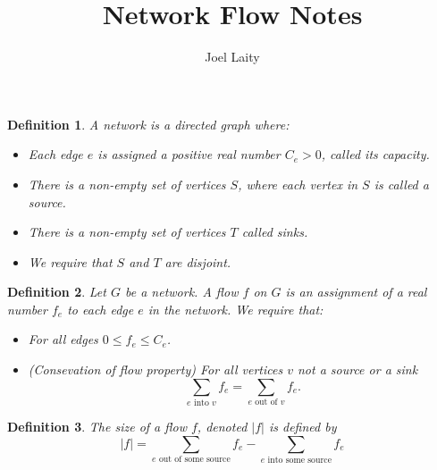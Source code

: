 \documentclass[12pt]{article}
\title{Network Flow Notes}
\author{Joel Laity}
\newtheorem{Definition}{Definition}
\begin{document}
\maketitle


\begin{Definition}
    A network is a directed graph where:
    \begin{itemize}
        \item Each edge $e$ is assigned a positive real number $C_e >0 $, called its \emph{capacity}.
        \item There is a non-empty set of vertices $S$, where each vertex in $S$ is called a \emph{source}.
        \item There is a non-empty set of vertices $T$ called \emph{sinks}.
        \item We require that $S$ and $T$ are disjoint.
    \end{itemize}
\end{Definition}

\begin{Definition}
    Let $G$ be a network. A \emph{flow} $f$ on $G$  is an assignment of a real number $f_e$ to each edge $e$ in the network. We require that:
    \begin{itemize}
        \item For all edges $0\leq f_e \leq C_e$.
        \item (Consevation of flow property) For all vertices $v$ not a source or a sink
              \[
                  \sum_{e\text{ into }v}f_e = \sum_{e\text{ out of }v}f_e .
              \]

    \end{itemize}
\end{Definition}

\begin{Definition}
    The \emph{size} of a flow $f$, denoted $|f|$ is defined by
    \[
        |f| = \sum_{e \text{ out of some source}} f_e - \sum_{e \text{ into some source}}f_e
    \]
\end{Definition}
\end{document}
